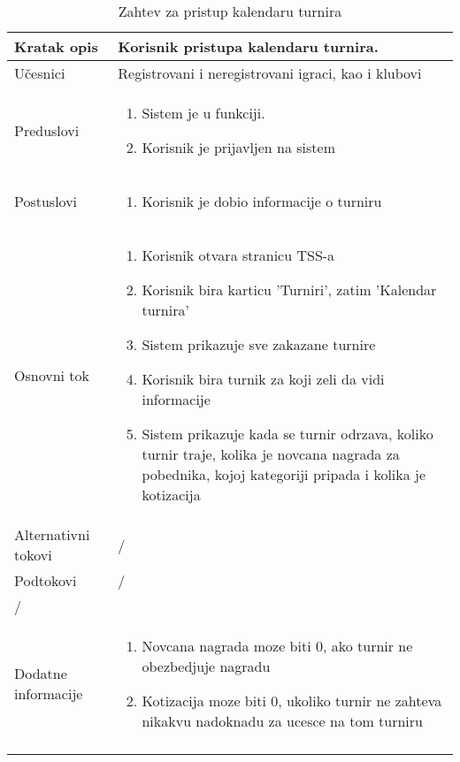 \documentclass{article}
\begin{document}
\begin{longtable}{| p{} | p{} |} 
\hline
    Kratak opis & Korisnik pristupa kalendaru turnira.\\ 
\hline    
    Učesnici & Registrovani i neregistrovani igraci, kao i klubovi
    \\
\hline
   Preduslovi & \begin{enumerate}
       \item Sistem je u funkciji.
       \item Korisnik je prijavljen na sistem
   \end{enumerate}\\
\hline  
    Postuslovi & \begin{enumerate}
        \item Korisnik je dobio informacije o turniru
    \end{enumerate}\\
\hline
    Osnovni tok & \begin{enumerate}
        \item Korisnik otvara stranicu TSS-a
        \item Korisnik bira karticu 'Turniri', zatim 'Kalendar turnira'
        \item Sistem prikazuje sve zakazane turnire
        \item Korisnik bira turnik za koji zeli da vidi informacije
        \item Sistem prikazuje kada se turnir odrzava, koliko turnir traje, kolika je novcana nagrada za pobednika, kojoj kategoriji pripada i kolika je kotizacija
    \end{enumerate}\\
\hline
    Alternativni tokovi &/\\
\hline
    Podtokovi & /\\
\hline
    /\\
\hline
    Dodatne informacije & \begin{enumerate}
        \item Novcana nagrada moze biti 0, ako turnir ne obezbedjuje nagradu
        \item Kotizacija moze biti 0, ukoliko turnir ne zahteva nikakvu nadoknadu za ucesce na tom turniru
    \end{enumerate}\\
\hline
\caption{Zahtev za pristup kalendaru turnira} %
\end{longtable}


\end{document}
